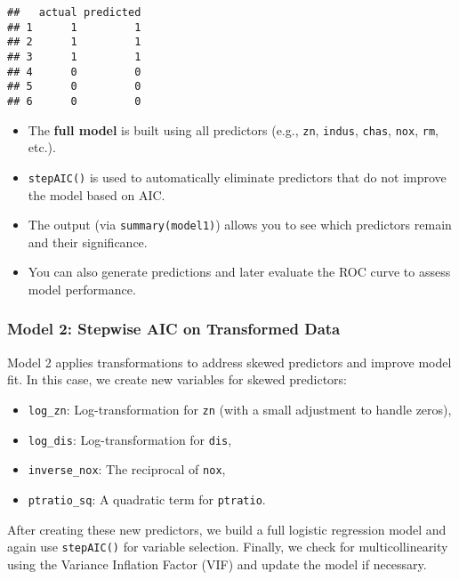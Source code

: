 \documentclass[
]{article}
\providecommand{\tightlist}{%
  \setlength{\itemsep}{0pt}\setlength{\parskip}{0pt}}
\begin{document}
\begin{verbatim}
##   actual predicted
## 1      1         1
## 2      1         1
## 3      1         1
## 4      0         0
## 5      0         0
## 6      0         0
\end{verbatim}

\begin{itemize}
\item
  The \textbf{full model} is built using all predictors (e.g.,
  \texttt{zn}, \texttt{indus}, \texttt{chas}, \texttt{nox}, \texttt{rm},
  etc.).
\item
  \texttt{stepAIC()} is used to automatically eliminate predictors that
  do not improve the model based on AIC.
\end{itemize}

\begin{itemize}
\tightlist
\item
  The output (via \texttt{summary(model1)}) allows you to see which
  predictors remain and their significance.
\end{itemize}

\begin{itemize}
\tightlist
\item
  You can also generate predictions and later evaluate the ROC curve to
  assess model performance.
\end{itemize}

\subsubsection{Model 2: Stepwise AIC on Transformed
Data}\label{model-2-stepwise-aic-on-transformed-data}

Model 2 applies transformations to address skewed predictors and improve
model fit. In this case, we create new variables for skewed predictors:

\begin{itemize}
\item
  \texttt{log\_zn}: Log-transformation for \texttt{zn} (with a small
  adjustment to handle zeros),
\item
  \texttt{log\_dis}: Log-transformation for \texttt{dis},
\item
  \texttt{inverse\_nox}: The reciprocal of \texttt{nox},
\item
  \texttt{ptratio\_sq}: A quadratic term for \texttt{ptratio}.
\end{itemize}

After creating these new predictors, we build a full logistic regression
model and again use \texttt{stepAIC()} for variable selection. Finally,
we check for multicollinearity using the Variance Inflation Factor (VIF)
and update the model if necessary.
\end{document}
